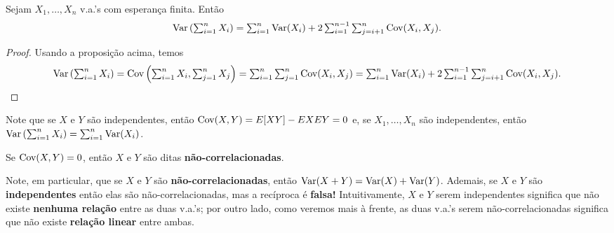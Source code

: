\documentclass[../Notas.tex]{subfiles}
\begin{document}
\begin{proposition}
Sejam $X_1, \dots, X_n$ v.a.'s com esperança finita. Então
\begin{align*}
    \Var\left( \sum_{i=1}^{n}X_i \right) = \sum_{i=1}^{n}\Var(X_i) + 2\sum_{i=1}^{n-1}\sum_{j=i+1}^{n}\Cov(X_i, X_j).
\end{align*}
\end{proposition}

\begin{proof}
Usando a proposição acima, temos
\begin{align*}
    \Var\left( \sum_{i=1}^{n}X_i \right) = \Cov\left( \sum_{i=1}^{n}X_i, \sum_{j=1}^{n}X_j \right) 
    = \sum_{i=1}^n\sum_{j=1}^n \Cov(X_i, X_j) 
    = \sum_{i=1}^n \Var(X_i) + 2\sum_{i=1}^{n-1}\sum_{j=i+1}^n\Cov(X_i, X_j).
\end{align*}
\end{proof}

\begin{remark}
Note que se $X$ e $Y$ são independentes, então $\text{Cov}(X,Y) = E[XY] - EXEY = 0$ e, se $X_1, \dots, X_n$ são independentes, então $\textstyle{ \text{Var}\left( \sum_{i=1}^n X_i \right) = \sum_{i=1}^n\text{Var}(X_i)}$.
\end{remark}

\begin{definition}[Correlação]
Se $\text{Cov}(X,Y) = 0$, então $X$ e $Y$ são ditas \textbf{não-correlacionadas}.
\end{definition}

Note, em particular, que se $X$ e $Y$ são \textbf{não-correlacionadas}, então $\text{Var}(X+Y) = \text{Var}(X) + \text{Var}(Y)$. Ademais, se $X$ e $Y$ são \textbf{independentes} então elas são não-correlacionadas, mas a recíproca é \textbf{falsa!} Intuitivamente, $X$ e $Y$ serem independentes significa que não existe \textbf{nenhuma relação} entre as duas v.a.'s; por outro lado, como veremos mais à frente, as duas v.a.'s serem não-correlacionadas significa que não existe \textbf{relação linear} entre ambas.
\end{document}

